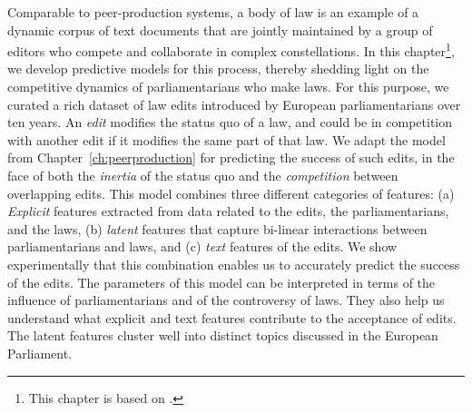
Comparable to peer-production systems, a body of law is an example of a dynamic corpus of text documents that are jointly maintained by a group of editors who compete and collaborate in complex constellations.
In this chapter\footnote{This chapter is based on \citet{kristof2020war, kristof2021war}.}, we develop predictive models for this process, thereby shedding light on the competitive dynamics of parliamentarians who make laws.
For this purpose, we curated a rich dataset of  law edits introduced by European parliamentarians over ten years.
An \textit{edit} modifies the status quo of a law, and could be in competition with another edit if it modifies the same part of that law.
We adapt the \interank{} model from Chapter~\ref{ch:peerproduction} for predicting the success of such edits, in the face of both the \textit{inertia} of the status quo and the \textit{competition} between overlapping edits.
This model combines three different categories of features:
(a) \emph{Explicit} features extracted from data related to the edits, the parliamentarians, and the laws, (b) \emph{latent} features that capture bi-linear interactions between parliamentarians and laws, and (c) \emph{text} features of the edits.
We show experimentally that this combination enables us to accurately predict the success of the edits.
The parameters of this model can be interpreted in terms of the influence of parliamentarians and of the controversy of laws.
They also help us understand what explicit and text features contribute to the acceptance of edits.
The latent features cluster well into distinct topics discussed in the European Parliament.
